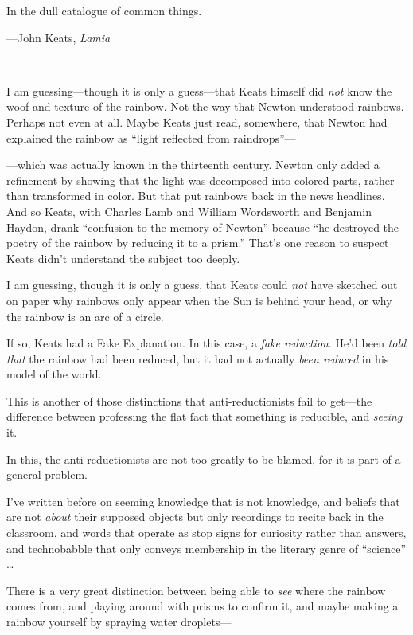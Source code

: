 {
 In the dull catalogue of common things.}

{\raggedleft
 {}---John Keats, \textit{Lamia}
\par}


\bigskip

{
 ~}

{
 I am guessing---though it is only a guess---that Keats himself did
\textit{not} know the woof and texture of the rainbow. Not the way that
Newton understood rainbows. Perhaps not even at all. Maybe Keats just
read, somewhere, that Newton had explained the rainbow as
``light reflected from
raindrops''---}

{
 {}---which was actually known in the thirteenth century. Newton
only added a refinement by showing that the light was decomposed into
colored parts, rather than transformed in color. But that put rainbows
back in the news headlines. And so Keats, with Charles Lamb and William
Wordsworth and Benjamin Haydon, drank ``confusion to
the memory of Newton'' because ``he
destroyed the poetry of the rainbow by reducing it to a
prism.'' That's one reason to suspect
Keats didn't understand the subject too deeply.}

{
 I am guessing, though it is only a guess, that Keats could
\textit{not} have sketched out on paper why rainbows only appear when
the Sun is behind your head, or why the rainbow is an arc of a circle.}

{
 If so, Keats had a Fake Explanation. In this case, a \textit{fake
reduction}. He'd been \textit{told that} the rainbow
had been reduced, but it had not actually \textit{been reduced} in his
model of the world.}

{
 This is another of those distinctions that anti-reductionists fail
to get---the difference between professing the flat fact that something
is reducible, and \textit{seeing} it.}

{
 In this, the anti-reductionists are not too greatly to be blamed,
for it is part of a general problem.}

{
 I've written before on seeming knowledge that is
not knowledge, and beliefs that are not \textit{about} their supposed
objects but only recordings to recite back in the classroom, and words
that operate as stop signs for curiosity rather than answers, and
technobabble that only conveys membership in the literary genre of
``science'' \ldots}

{
 There is a very great distinction between being able to
\textit{see} where the rainbow comes from, and playing around with
prisms to confirm it, and maybe making a rainbow yourself by spraying
water droplets---}

